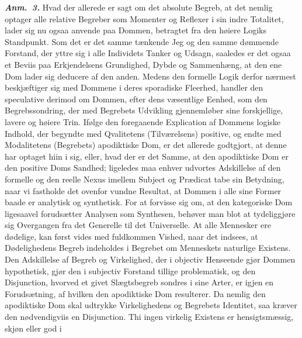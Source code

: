 \documentclass[12pt]{book}
\newcommand{\anm}[1]{\emph{\textbf{Anm.~#1.}}}
\newcommand{\opage}[1]{\marginnote{\footnotesize\textit{[#1]}}}
\begin{document}
\anm{3} Hvad der allerede er sagt om det absolute Begreb, at det nemlig optager
alle relative Begreber som Momenter og Reflexer i sin indre Totalitet, lader sig
nu ogsaa anvende paa Dommen, betragtet fra den høiere Logiks Standpunkt. Som det
er det samme tænkende Jeg og den samme dømmende Forstand, der yttre sig i alle
Individets Tanker og Udsagn, saaledes er det ogsaa et Beviis paa Erkjendelsens
Grundighed, Dybde og Sammenhæng, at den ene Dom lader sig deducere af den anden.
Medens den formelle Logik derfor nærmest beskjæftiger sig med Dommene i deres
sporadiske Fleerhed, handler den speculative derimod om Dommen, efter dens
væsentlige Eenhed, som den Begrebssondring, der med Begrebets Udvikling
gjennemløber sine forskjellige, lavere og høiere Trin. Ifølge den foregaaende
Explication af Dommens logiske Indhold, der begyndte med Qvalitetens
(Tilværelsens) positive, og endte med Modalitetens (Begrebets) apodiktiske Dom, er
det allerede godtgjort, at denne har optaget hiin i sig, eller, hvad der er det
Samme, at den apodiktiske Dom er den positive Doms Sandhed; ligeledes maa enhver
udvortes Adskillelse af den
\opage{61} formelle og den reelle Nexus imellem Subject og Prædicat tabe sin Betydning, naar
vi fastholde det ovenfor vundne Resultat, at Dommen i alle sine Former baade er
analytisk og synthetisk. For at forvisse sig om, at den kategoriske Dom ligesaavel
forudsætter Analysen som Synthesen, behøver man blot at tydeliggjøre sig
Overgangen fra det Generelle til det Universelle. At alle Mennesker ere dødelige,
kan først vides med fuldkommen Vished, naar det indsees, at Dødelighedens Begreb
indeholdes i Begrebet om Menneskets naturlige Existens. Den Adskillelse af Begreb
og Virkelighed, der i objectiv Henseende gjør Dommen hypothetisk, gjør den i
subjectiv Forstand tillige problematisk, og den Disjunction, hvorved et givet
Slægtsbegreb sondres i sine Arter, er igjen en Forudsætning, af hvilken den
apodiktiske Dom resulterer. Da nemlig den apodiktiske Dom skal udtrykke
Virkelighedens og Begrebets Identitet, saa kræver den nødvendigviis en
Disjunction. Thi ingen virkelig Existens er hensigtsmæssig, skjøn eller god i
\end{document}
